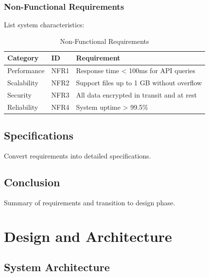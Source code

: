 \documentclass[12pt,a4paper,onecolumn,oneside]{report}
\begin{document}
\subsection{Non-Functional Requirements}
\label{sec:req:nonfunctional}

List system characteristics:

\begin{table}[h]
    \centering
    \caption{Non-Functional Requirements}
    \label{tab:nfr}
    \begin{tabular}{|l|l|p{5cm}|}
        \hline
        \textbf{Category} & \textbf{ID} & \textbf{Requirement} \\
        \hline
        Performance & NFR1 & Response time < 100ms for API queries \\
        \hline
        Scalability & NFR2 & Support files up to 1 GB without overflow \\
        \hline
        Security & NFR3 & All data encrypted in transit and at rest \\
        \hline
        Reliability & NFR4 & System uptime > 99.5\% \\
        \hline
    \end{tabular}
\end{table}

\section{Specifications}
\label{sec:specifications}

Convert requirements into detailed specifications.

\section{Conclusion}
\label{sec:req:conclusion}

Summary of requirements and transition to design phase.


\chapter{Design and Architecture}
\label{chap:design}

\section{System Architecture}
\label{sec:design:architecture}
\end{document}
